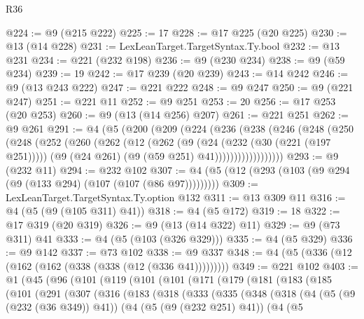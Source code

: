 \begin{lexlean}{R36}
\begin{coremodule}
@224 := @9 (@215 @222)
@225 := 17
@228 := @17 @225 (@20 @225)
@230 := @13 (@14 @228)
@231 := LexLeanTarget.TargetSyntax.Ty.bool
@232 := @13 @231
@234 := @221 (@232 @198)
@236 := @9 (@230 @234)
@238 := @9 (@59 @234)
@239 := 19
@242 := @17 @239 (@20 @239)
@243 := @14 @242
@246 := @9 (@13 @243 @222)
@247 := @221 @222
@248 := @9 @247
@250 := @9 (@221 @247)
@251 := @221 @11
@252 := @9 @251
@253 := 20
@256 := @17 @253 (@20 @253)
@260 := @9 (@13 (@14 @256) @207)
@261 := @221 @251
@262 := @9 @261
@291 := @4
    (@5
      (@200
        (@209
          (@224
            (@236
              (@238
                (@246
                  (@248
                    (@250
                      (@248
                        (@252
                          (@260
                            (@262
                              (@12
                                (@262
                                  (@9
                                    (@24 (@232 (@30 (@221 (@197 @251)))))
                                    (@9 (@24 @261) (@9 (@59 @251) @41))))))))))))))))))
@293 := @9 (@232 @11)
@294 := @232 @102
@307 := @4 (@5 (@12 (@293 (@103 (@9 @294 (@9 (@133 @294) (@107 (@107 (@86 @97)))))))))
@309 := LexLeanTarget.TargetSyntax.Ty.option @132
@311 := @13 @309 @11
@316 := @4 (@5 (@9 (@105 @311) @41))
@318 := @4 (@5 @172)
@319 := 18
@322 := @17 @319 (@20 @319)
@326 := @9 (@13 (@14 @322) @11)
@329 := @9 (@73 @311) @41
@333 := @4 (@5 (@103 (@326 @329)))
@335 := @4 (@5 @329)
@336 := @9 @142
@337 := @73 @102
@338 := @9 @337
@348 := @4 (@5 (@336 (@12 (@162 (@162 (@338 (@338 (@12 (@336 @41)))))))))
@349 := @221 @102
@403 := @1
    (@45
      (@96
        (@101
          (@119
            (@101
              (@101
                (@171
                  (@179
                    (@181
                      (@183
                        (@185
                          (@101
                            (@291
                              (@307
                                (@316
                                  (@183
                                    (@318
                                      (@333
                                        (@335
                                          (@348
                                            (@318
                                              (@4
                                                (@5 (@9 (@232 (@36 @349)) @41))
                                                (@4
                                                  (@5 (@9 (@232 @251) @41))
                                                  (@4
                                                    (@5

\end{coremodule}
\end{lexlean}

